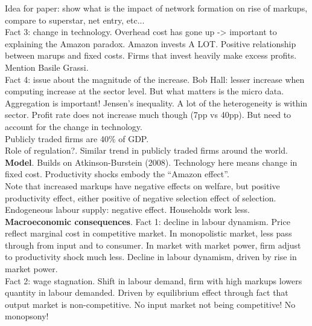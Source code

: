 \documentclass{amsart}
\theoremstyle{definition}
\theoremstyle{remark}
\numberwithin{equation}{section}
\begin{document}
Idea for paper: show what is the impact of network formation on rise of markups, compare to superstar, net entry, etc...\\

Fact 3: change in technology. Overhead cost has gone up -> important to explaining the Amazon paradox. Amazon invests A LOT. Positive relationship between marups and fixed costs. Firms that invest heavily make excess profits.\\

Mention Basile Grassi.\\

Fact 4: issue about the magnitude of the increase. Bob Hall: lesser increase when computing increase at the sector level. But what matters is the micro data. Aggregation is important! Jensen's inequality. A lot of the heterogeneity is within sector. Profit rate does not increase much though (7pp vs 40pp). But need to account for the change in technology.\\

Publicly traded firms are 40\% of GDP.\\

Role of regulation?. Similar trend in publicly traded firms around the world. \\

\textbf{Model}. Builds on Atkinson-Burstein (2008). Technology here means change in fixed cost. Productivity shocks embody the ``Amazon effect''.\\

Note that increased markups have negative effects on welfare, but positive productivity effect, either positive of negative selection effect of selection. Endogeneous labour supply: negative effect. Households work less.\\

\textbf{Macroeconomic consequences}. Fact 1: decline in labour dynamism. Price reflect marginal cost in competitive market. In monopolistic market, less pass through from input and to consumer. In market with market power, firm adjust to productivity shock much less. Decline in labour dynamism, driven by rise in market power.\\

Fact 2: wage stagnation. Shift in labour demand, firm with high markups lowers quantity in labour demanded. Driven by equilibrium effect through fact that output market is non-competitive. No input market not being competitive! No monopsony!\\
\end{document}

